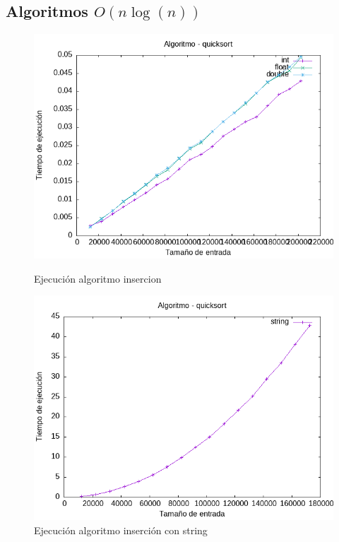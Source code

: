\documentclass[11pt]{article}
\begin{document}
    \subsection{Algoritmos  \(O(n\log(n))\)}
    \begin{figure}[H]
        \begin{minipage}{0.5\textwidth}
            \centering
            \includegraphics[width=\linewidth]{assets/Img/quicksort.png}
            \caption{Ejecución algoritmo insercion}
            \label{fig:quicksort}
        \end{minipage}%
        \begin{minipage}{0.5\textwidth}
            \centering
            \includegraphics[width=\linewidth]{assets/Img/quicksortstring.png}
            \caption{Ejecución algoritmo inserción con string}
            \label{fig:quicksortstring}
        \end{minipage}
    \end{figure}
\end{document}
